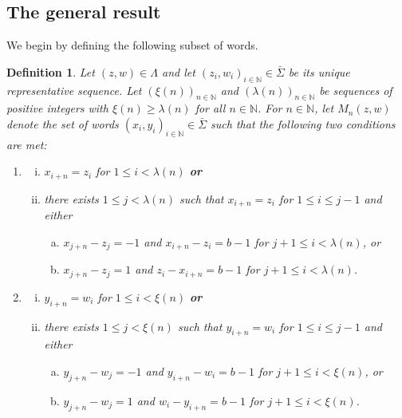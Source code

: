 \documentclass[12pt]{article}
\newtheorem{definition}{Definition}[section]} %
\theoremstyle{remark}
\numberwithin{equation}{section}
\renewcommand{\Bbb}[1]{\mathbb{#1}}
\newcommand{\N}{{\Bbb N}}         %
\newcommand{\0}{\mathbf{0}}
\begin{document}
\subsection{The general result}

We begin by defining the following subset of words. 

\begin{definition} \label{DefM(z,w)}
Let $(z,w) \in \Lambda$ and let $(z_{i},w_{i})_{i \in \N} \in \bar{\Sigma}$ be its unique representative sequence.
Let $(\xi(n))_{n \in \N}$ and $(\lambda(n))_{n \in \N}$ be sequences of positive integers with $\xi(n) \geq \lambda(n)$ for all $n \in \N$. For $n \in \N$, let $M_{n}(z,w)$ denote the set of words $(x_{i},y_{i})_{i \in \N} \in \bar{\Sigma}$ such that the following two conditions are met:
\begin{enumerate}[(1)]
\item{
\begin{enumerate}[(i)]
\item{$x_{i+n}=z_{i}$ for $1 \leq i < \lambda(n)$ 
{\bf \emph{or}}}
\item{there exists $1\leq j < \lambda(n)$ such that $x_{i+n}=z_{i}$ for $1\leq i \leq j-1$ and either
\begin{enumerate}[(a)] 
\item{$x_{j+n}-z_{j}=-1$ and $x_{i+n}-z_{i}=b-1$ for $j+1 \leq i < \lambda(n)$, or}
\item{$x_{j+n}-z_{j}=1$ and $z_{i}-x_{i+n}=b-1$ for $j+1 \leq i < \lambda(n)$.}
\end{enumerate}}
\end{enumerate}}
\item{
\begin{enumerate}[(i)]
\item{$y_{i+n}=w_{i}$ for $1 \leq i < \xi(n)$ {\bf \emph{or}}} 
\item{there exists $1 \leq j < \xi(n)$ such that $y_{i+n}=w_{i}$ for $1\leq i \leq j-1$ and either
\begin{enumerate}[(a)] 
\item{$y_{j+n}-w_{j}=-1$ and $y_{i+n}-w_{i}=b-1$ for $j+1 \leq i < \xi(n)$, or}
\item{$y_{j+n}-w_{j}=1$ and $w_{i}-y_{i+n}=b-1$ for $j+1 \leq i < \xi(n)$.}
\end{enumerate}}
\end{enumerate}}
\end{enumerate}
 \end{definition}
 
\end{document}
